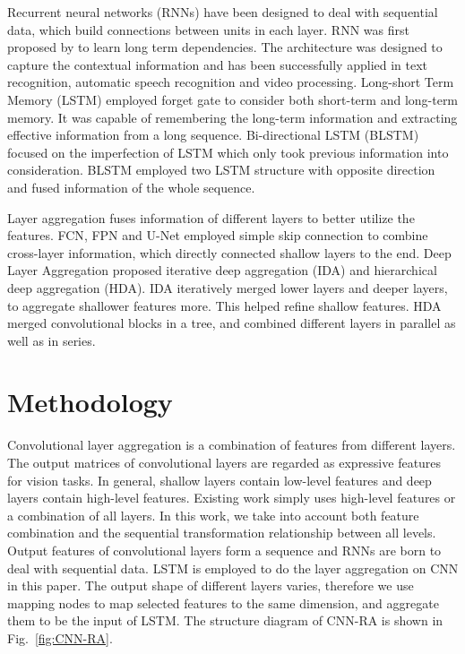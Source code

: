 \documentclass[runningheads]{llncs}
\begin{document}
Recurrent neural networks (RNNs) have been designed to deal with sequential data, which build connections between units in each layer. RNN was first proposed by \cite{rnn} to learn long term dependencies. The architecture was designed to capture the contextual information and has been successfully applied in text recognition\cite{text_rnn}, automatic speech recognition\cite{speech_rnn} and video processing\cite{video_rnn}. Long-short Term Memory (LSTM)\cite{lstm} employed forget gate to consider both short-term and long-term memory.  It was capable of remembering the long-term information and extracting effective information from a long sequence. Bi-directional LSTM (BLSTM)\cite{blstm} focused on the imperfection of LSTM which only took previous information into consideration. BLSTM employed two LSTM structure with opposite direction and fused information of the whole sequence.

Layer aggregation fuses information of different layers to better utilize the features. FCN\cite{FCN}, FPN\cite{FPN} and U-Net\cite{U-Net} employed simple skip connection to combine cross-layer information, which directly connected shallow layers to the end. Deep Layer Aggregation\cite{dla} proposed iterative deep aggregation (IDA) and hierarchical deep aggregation (HDA). IDA iteratively merged lower layers and deeper layers, to aggregate shallower features more. This  helped refine shallow features. HDA merged convolutional blocks in a tree, and combined different layers in parallel as well as in series.
\section{Methodology}
Convolutional layer aggregation is a combination of features from different layers. The output matrices of convolutional layers are regarded as expressive features for vision tasks. In general, shallow layers contain low-level features and deep layers contain high-level features. Existing work simply uses high-level features or a combination of all layers. In this work, we take into account both feature combination and the sequential transformation relationship between all levels. Output features of convolutional layers form a sequence and RNNs are born to deal with sequential data. LSTM is employed to do the layer aggregation on CNN in this paper. The output shape of different layers varies, therefore we use mapping nodes to map selected features to the same dimension, and aggregate them to be the input of LSTM. The structure diagram of CNN-RA is shown in Fig.~\ref{fig:CNN-RA}.
\end{document}
